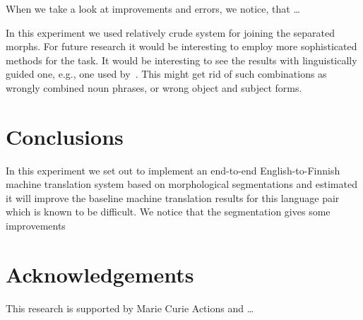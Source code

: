 \documentclass[color]{pbml}
\begin{document}
When we take a look at improvements and errors, we notice, that \ldots

In this experiment we used relatively crude system for joining the separated
morphs. For future research it would be interesting to employ more
sophisticated methods for the task. It would be interesting to see the results
with linguistically guided one, e.g., one used by~\citet{cap2014unseen}. This
might get rid of such combinations as wrongly combined noun phrases, or wrong
object and subject forms.

\section{Conclusions}
\label{sec:conclusion}

In this experiment we set out to implement an end-to-end English-to-Finnish
machine translation system based on morphological segmentations and estimated
it will improve the baseline machine translation results for this language pair
which is known to be difficult. We notice that the segmentation gives some 
improvements

\section*{Acknowledgements}
This research is supported by Marie Curie Actions and \ldots



\correspondingaddress
\end{document}
